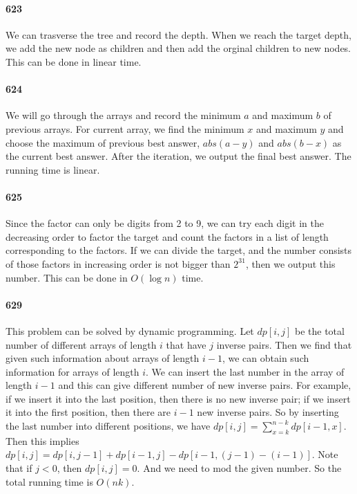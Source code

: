 \documentclass[11pt]{article}
\begin{document}
\begin{itemize}
{\paragraph{623}
We can trasverse the tree and record the depth. When we reach the target depth, we add the new node as children and then add the 
orginal children to new nodes. This can be done in linear time.

\paragraph{624}
We will go through the arrays and record the minimum $a$ and maximum $b$ of previous arrays. 
For current array, we find the minimum $x$ and maximum $y$ and choose the maximum of previous best answer, $abs(a-y)$ and 
$abs(b-x)$ as the current best answer. After the iteration, we output the final best answer.
The running time is linear.

\paragraph{625}
Since the factor can only be digits from 2 to 9, we can try each digit in the decreasing order to factor the target and count 
the factors in a list of length corresponding to the factors. 
If we can divide the target, and the number consists of those factors in increasing order is not bigger than $2^31$, then we 
output this number. 
This can be done in $O(\log n)$ time.

\paragraph{629}
This problem can be solved by dynamic programming. Let $dp[i,j]$ be the total number of different arrays of length $i$ that 
have $j$ inverse pairs. Then we find that given such information about arrays of length $i-1$, we can obtain such information 
for arrays of length $i$.
We can insert the last number in the array of length $i-1$ and this can give different number of new inverse pairs.
For example, if we insert it into the last position, then there is no new inverse pair; if we insert it into the first 
position, then there are $i-1$ new inverse pairs. So by inserting the last number into different positions, we have 
$dp[i, j] = \sum_{x = k}^{n-k} dp[i-1, x]$. Then this implies $dp[i, j] = dp[i, j-1] + dp[i-1, j] - dp[i-1, (j-1)-(i-1)]$.
Note that if $j < 0$, then $dp[i, j] = 0$. And we need to mod the given number.
So the total running time is $O(nk)$.


}
\end{itemize}
\end{document}
